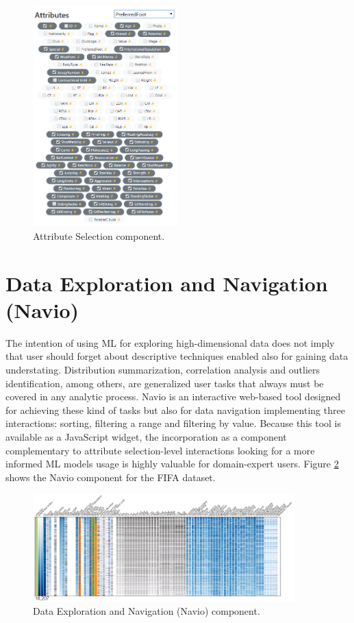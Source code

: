 \begin{figure}[ht]
 \centering
 \includegraphics[width=0.5\textwidth]{attribute-selection.png}
 \caption{Attribute Selection component.}
 \label{fig:attribute-selection-component}
\end{figure}

\section{Data Exploration and Navigation (Navio)}
\label{navio-section}

The intention of using ML for exploring high-dimensional data does not imply that user should forget about descriptive techniques enabled also for gaining data understating. Distribution summarization, correlation analysis and outliers identification, among others, are generalized user tasks that always must be covered in any analytic process. Navio \cite{Guerra-Gomez2018Navio:Datasets} is an interactive web-based tool designed for achieving these kind of tasks but also for data navigation implementing three interactions: sorting, filtering a range and filtering by value. Because this tool is available as a JavaScript widget, the incorporation as a component complementary to attribute selection-level interactions looking for a more informed ML models usage is highly valuable for domain-expert users. Figure \ref{fig:navio-component} shows the Navio component for the FIFA dataset.  

\begin{figure}[ht]
 \centering
 \includegraphics[width=0.9\textwidth]{navio.png}
 \caption{Data Exploration and Navigation (Navio) component.}
 \label{fig:navio-component}
\end{figure}

